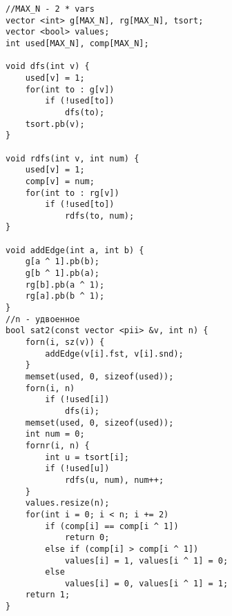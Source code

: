\begin{verbatim}
//MAX_N - 2 * vars
vector <int> g[MAX_N], rg[MAX_N], tsort;
vector <bool> values;
int used[MAX_N], comp[MAX_N];

void dfs(int v) {
	used[v] = 1;
	for(int to : g[v])
		if (!used[to])
			dfs(to);
	tsort.pb(v);
}

void rdfs(int v, int num) {
	used[v] = 1;
	comp[v] = num;
	for(int to : rg[v]) 
		if (!used[to])
			rdfs(to, num);
}

void addEdge(int a, int b) {
	g[a ^ 1].pb(b);
	g[b ^ 1].pb(a);
	rg[b].pb(a ^ 1);
	rg[a].pb(b ^ 1);
}
//n - удвоенное
bool sat2(const vector <pii> &v, int n) {
	forn(i, sz(v)) {
		addEdge(v[i].fst, v[i].snd); 
	}
	memset(used, 0, sizeof(used));
	forn(i, n)
		if (!used[i])
			dfs(i);
	memset(used, 0, sizeof(used));
	int num = 0;
	fornr(i, n) {
		int u = tsort[i];
		if (!used[u])
			rdfs(u, num), num++;
	}
	values.resize(n);
	for(int i = 0; i < n; i += 2)
		if (comp[i] == comp[i ^ 1])
			return 0;
		else if (comp[i] > comp[i ^ 1])
			values[i] = 1, values[i ^ 1] = 0;
		else
			values[i] = 0, values[i ^ 1] = 1;
	return 1;
}
\end{verbatim}
